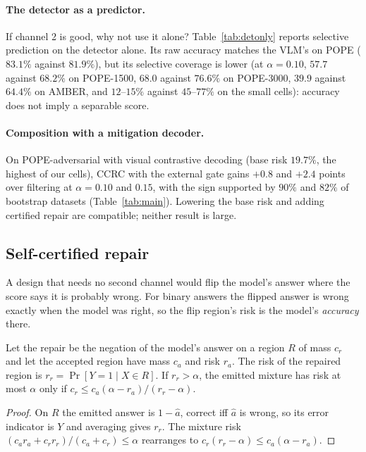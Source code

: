 \paragraph{The detector as a predictor.}
If channel 2 is good, why not use it alone? Table~\ref{tab:detonly} reports selective prediction on the detector
alone. Its raw accuracy matches the VLM's on POPE ($83.1\%$ against $81.9\%$), but its selective coverage is lower
(at $\alpha=0.10$, $57.7$ against $68.2\%$ on POPE-1500, $68.0$ against $76.6\%$ on POPE-3000, $39.9$ against $64.4\%$ on AMBER, and $12$--$15\%$ against $45$--$77\%$ on
the small cells): accuracy does not imply a separable score.

\begin{table}[t]
\centering
\caption{Certified coverage (\%) of VLM filtering, CCRC (external gate) and detector-only selective prediction,
and the detector's accuracy on grounded items.}
\label{tab:detonly}
\small
\resizebox{\textwidth}{!}{}
\end{table}

\paragraph{Composition with a mitigation decoder.}
On POPE-adversarial with visual contrastive decoding \citep{vcd} (base risk $19.7\%$, the highest of our cells),
CCRC with the external gate gains $+0.8$ and $+2.4$ points over filtering at $\alpha=0.10$ and $0.15$, with the
sign supported by $90\%$ and $82\%$ of bootstrap datasets (Table~\ref{tab:main}). Lowering the base risk and
adding certified repair are compatible; neither result is large.

\subsection{Self-certified repair}
\label{sec:selfrepair}

A design that needs no second channel would flip the model's answer where the score says it is probably wrong.
For binary answers the flipped answer is wrong exactly when the model was right, so the flip region's risk
is the model's \emph{accuracy} there.

\begin{proposition}
\label{prop:selfrepair}
Let the repair be the negation of the model's answer on a region $R$ of mass $c_r$ and let the accepted region have
mass $c_a$ and risk $r_a$. The risk of the repaired region is $r_r=\Pr[Y=1\mid X\in R]$. If $r_r>\alpha$, the
emitted mixture has risk at most $\alpha$ only if $c_r\le c_a(\alpha-r_a)/(r_r-\alpha)$.
\end{proposition}
\begin{proof}
On $R$ the emitted answer is $1-\hat a$, correct iff $\hat a$ is wrong, so its error indicator is $Y$ and averaging gives
$r_r$. The mixture risk $(c_ar_a+c_rr_r)/(c_a+c_r)\le\alpha$ rearranges to $c_r(r_r-\alpha)\le c_a(\alpha-r_a)$.
\end{proof}

